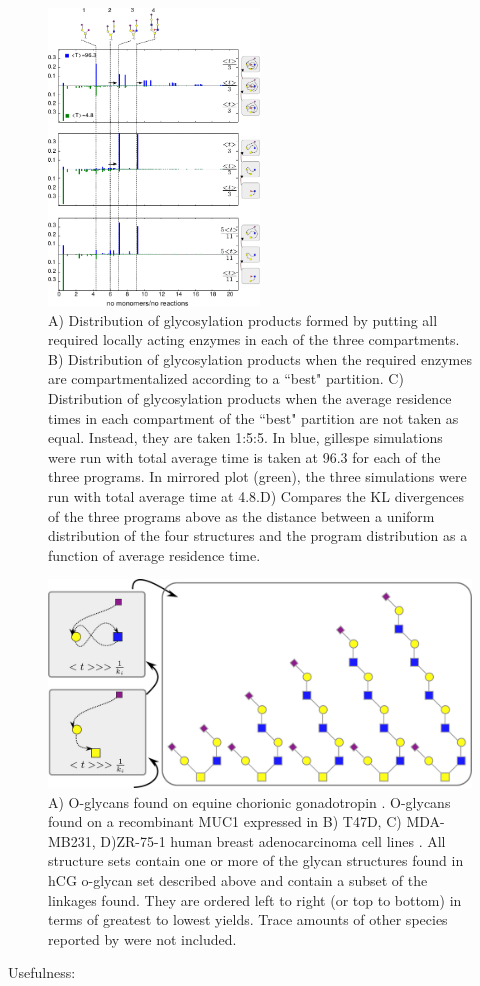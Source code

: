 \documentclass[twocolumn]{article}
\begin{document}
\begin{figure}[h]
    \includegraphics[width=0.5\textwidth]{Figure_4.pdf}
	\caption{A) Distribution of glycosylation products formed by putting all required locally acting enzymes in each of the three compartments. B) Distribution of glycosylation products when the required enzymes are compartmentalized according to a ``best" partition. C) Distribution of glycosylation products when the average residence times in each compartment of the ``best" partition are not taken as equal. Instead, they are taken 1:5:5. In blue, gillespe simulations were run with total average time is taken at 96.3 for each of the three programs. In mirrored plot (green), the three simulations were run with total average time at 4.8.D) Compares the KL divergences of the three programs above as the distance between a uniform distribution of the four structures and the program distribution as a function of average residence time.}
\end{figure}


\begin{figure}
    \includegraphics[width=\textwidth]{Figure_6.pdf}
	\caption{A) O-glycans found on equine chorionic gonadotropin \cite{Hokke1994}. O-glycans found on a recombinant MUC1 expressed in B) T47D, C) MDA-MB231, D)ZR-75-1 human breast adenocarcinoma cell lines \cite{Muller2002}. All structure sets contain one or more of the glycan structures found in hCG o-glycan set described above and contain a subset of the linkages found. They are ordered left to right (or top to bottom) in terms of greatest to lowest yields. Trace amounts of other species reported by \cite{Muller2002} were not included.}
\end{figure}

Usefulness: 



 
\end{document}
